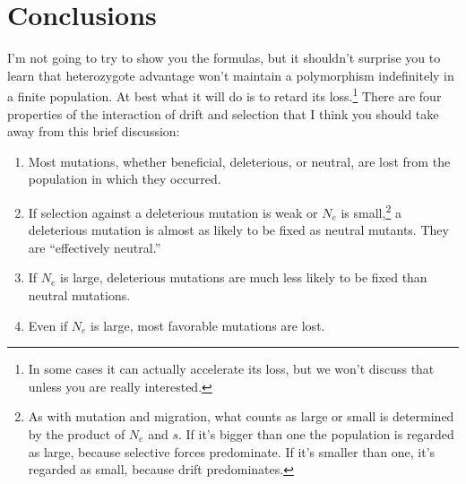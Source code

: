 \documentclass[12pt]{article}
\begin{document}
\section*{Conclusions}

I'm not going to try to show you the formulas, but it shouldn't
surprise you to learn that heterozygote advantage won't maintain a
polymorphism indefinitely in a finite population. At best what it will
do is to retard its loss.\footnote{In some cases it can actually
  accelerate its loss, but we won't discuss that unless you are really
  interested.}  There are four properties of the interaction of drift
and selection that I think you should take away from this brief
discussion:

\begin{enumerate}

\item Most mutations, whether beneficial, deleterious, or neutral, are
  lost from the population in which they occurred.

\item If selection against a deleterious mutation is weak or $N_e$ is
  small,\footnote{As with mutation and migration, what counts as large
    or small is determined by the product of $N_e$ and $s$. If it's
    bigger than one the population is regarded as large, because
    selective forces predominate. If it's smaller than one, it's
    regarded as small, because drift predominates.} a deleterious
  mutation is almost as likely to be fixed as neutral mutants. They
  are ``effectively neutral.''

\item If $N_e$ is large, deleterious mutations are much less likely to
  be fixed than neutral mutations.

\item Even if $N_e$ is large, most favorable mutations are lost.

\end{enumerate}

\ccLicense
\end{document}
